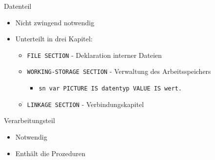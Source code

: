 \begin{slide}{Datenteil}
	\begin{itemize}
		\item{Nicht zwingend notwendig}
		\item{Unterteilt in drei Kapitel:
			\begin{itemize}
				\item{\texttt{FILE SECTION} - Deklaration interner Dateien}
				\item{\texttt{WORKING-STORAGE SECTION} - Verwaltung des Arbeitsspeichers
					\begin{itemize}
						\item{\texttt{sn var PICTURE IS datentyp VALUE IS wert.}}
					\end{itemize}				
				}
				\item{\texttt{LINKAGE SECTION} - Verbindungskapitel}
			\end{itemize}		
		}
	\end{itemize}
\end{slide}


\begin{slide}{Verarbeitungsteil}
	\begin{itemize}
		\item{Notwendig}
		\item{Enthält die Prozeduren}
	\end{itemize}
\end{slide}

